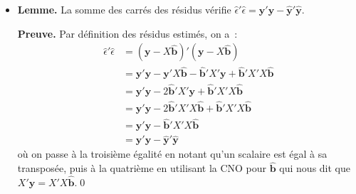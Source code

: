 \documentclass[10pt]{beamer}
\begin{document}
\begin{notes}
  \begin{itemize}

  \item \textbf{Lemme.} La somme des carrés des résidus vérifie $\hat\epsilon'\hat\epsilon = \mathbf y'\mathbf y - \hat{\mathbf y}'\hat{\mathbf y}$.\newline

    \textbf{Preuve.} Par définition des résidus estimés, on a~:
    \[
      \begin{split}
        \hat\epsilon'\hat\epsilon &= (\mathbf y-X\hat{\mathbf b})'(\mathbf y-X\hat{\mathbf b})\\
                                  &= \mathbf y'\mathbf y - \mathbf y'X\hat{\mathbf b} - \hat{\mathbf b}'X'\mathbf y + \hat{\mathbf b}'X'X\hat{\mathbf b}\\
                                  &= \mathbf y'\mathbf y - 2\hat{\mathbf b}'X'\mathbf y + \hat{\mathbf b}'X'X\hat{\mathbf b}\\
                                  &= \mathbf y'\mathbf y - 2\hat{\mathbf b}'X'X\hat{\mathbf b} + \hat{\mathbf b}'X'X\hat{\mathbf b}\\
                                  &= \mathbf y'\mathbf y - \hat{\mathbf b}'X'X\hat{\mathbf b}\\
                                  &= \mathbf y'\mathbf y - \hat{\mathbf y}'\hat{\mathbf y}
      \end{split}
    \]
où on passe à la troisième égalité en notant qu'un scalaire est égal à sa transposée, puis à la quatrième en utilisant la CNO pour $\hat{\mathbf b}$ qui nous dit que $X'\mathbf y = X'X \hat{\mathbf b}$.\qed\newline


\end{itemize}
\end{notes}
\end{document}
